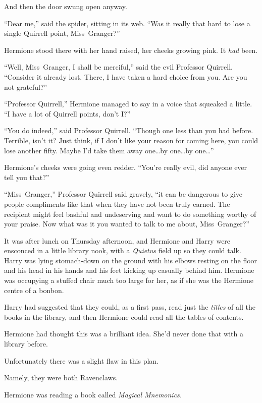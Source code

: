 And then the door swung open anyway.

“Dear me,” said the spider, sitting in its web.
“Was it really that hard to lose a single Quirrell point, Miss~Granger?”

Hermione stood there with her hand raised, her cheeks growing pink. It \emph{had} been.

“Well, Miss~Granger, I shall be merciful,” said the evil Professor Quirrell.
“Consider it already lost. There, I have taken a hard choice from you. Are you not grateful?”

“Professor Quirrell,” Hermione managed to say in a voice that squeaked a little.
“I have a lot of Quirrell points, don’t I?”

“You do indeed,” said Professor Quirrell.
“Though one less than you had before. Terrible, isn’t it? Just think, if I don’t like your reason for coming here, you could lose another fifty. Maybe I’d take them away one…by one…by one…”

Hermione’s cheeks were going even redder.
“You’re really evil, did anyone ever tell you that?”

“Miss~Granger,” Professor Quirrell said gravely, “it can be dangerous to give people compliments like that when they have not been truly earned. The recipient might feel bashful and undeserving and want to do something worthy of your praise. Now what was it you wanted to talk to me about, Miss~Granger?”

\later

It was after lunch on Thursday afternoon, and Hermione and Harry were ensconced in a little library nook, with a \emph{Quietus} field up so they could talk. Harry was lying stomach-down on the ground with his elbows resting on the floor and his head in his hands and his feet kicking up casually behind him. Hermione was occupying a stuffed chair much too large for her, as if she was the Hermione centre of a bonbon.

Harry had suggested that they could, as a first pass, read just the \emph{titles} of all the books in the library, and then Hermione could read all the tables of contents.

Hermione had thought this was a brilliant idea. She’d never done that with a library before.

Unfortunately there was a slight flaw in this plan.

Namely, they were both Ravenclaws.

Hermione was reading a book called \emph{Magical Mnemonics.}

